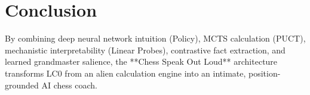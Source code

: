 \documentclass[11pt,a4paper]{report}
\begin{document}
\section{Conclusion}
By combining deep neural network intuition (Policy), MCTS calculation (PUCT), mechanistic interpretability (Linear Probes), contrastive fact extraction, and learned grandmaster salience, the **Chess Speak Out Loud** architecture transforms LC0 from an alien calculation engine into an intimate, position-grounded AI chess coach.
\end{document}
